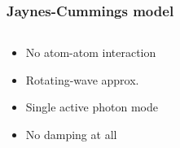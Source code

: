\documentclass[t]{beamer}
\begin{document}
\begin{frame}
\frametitle{Jaynes-Cummings model}

\begin{columns}
    \begin{column}{0.5\textwidth}
        \begin{itemize}
        \item No atom-atom interaction
        \item Rotating-wave approx.
        \item Single active photon mode
        \item No damping at all
        \end{itemize}
    \end{column}
    \begin{column}{0.5\textwidth}
        \begin{center}

            \begin{tikzpicture}[x=0.75pt,y=0.75pt,yscale=-0.7,xscale=0.7]
            

\end{tikzpicture}
\end{center}
\end{column}
\end{columns}
\end{frame}
\end{document}
